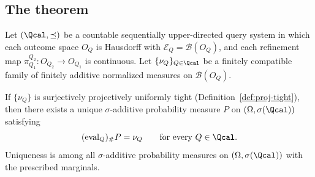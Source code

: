 \subsection*{The theorem}

\begin{theorem}
\label{thm:prokhorov}
Let $(\Qcal,\preceq)$ be a countable sequentially upper-directed
query system in which each outcome space $O_Q$ is Hausdorff with
$\mathcal{E}_Q=\mathcal{B}(O_Q)$, and each refinement map
$\pi^{Q_2}_{Q_1}:O_{Q_2}\to O_{Q_1}$ is continuous.
Let $\{\nu_Q\}_{Q\in\Qcal}$ be a finitely compatible family of
finitely additive normalized measures on $\mathcal{B}(O_Q)$.

If $\{\nu_Q\}$ is surjectively projectively uniformly tight
(Definition~\ref{def:proj-tight}), then there exists a unique
$\sigma$-additive probability measure $P$ on $(\Omega,\sigma(\Qcal))$
satisfying
\[
(\mathrm{eval}_Q)_\#P=\nu_Q
\qquad\text{for every }Q\in\Qcal.
\]
Uniqueness is among all $\sigma$-additive probability measures on
$(\Omega,\sigma(\Qcal))$ with the prescribed marginals.
\end{theorem}

